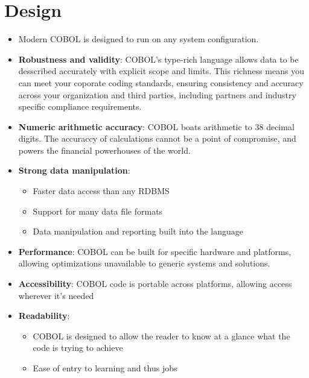 \documentclass[12pt]{article}
\begin{document}
\section{Design}

\begin{itemize}

    \item Modern COBOL is designed to run on any system configuration.
    \item \textbf{Robustness and validity}: COBOL's type-rich language allows data to be desscribed accurately with explicit scope and limits. This richness means you can meet your coporate coding standards, ensuring consistency and accuracy across your organization and third parties, including partners and industry specific compliance requirements.
    \item \textbf{Numeric arithmetic accuracy}: COBOL boats arithmetic to 38 decimal digits. The accuraccy of calculations cannot be a point of compromise, and powers the financial powerhouses of the world.
    \item \textbf{Strong data manipulation}:
    \begin{itemize}
        \item Faster data access than any RDBMS
        \item Support for many data file formats
        \item Data manipulation and reporting built into the language
    \end{itemize}
    \item \textbf{Performance}: COBOL can be built for specific hardware and platforms, allowing optimizations unavailable to generic systems and solutions.
    \item \textbf{Accessibility}: COBOL code is portable across platforms, allowing access wherever it's needed
    \item \textbf{Readability}:
    \begin{itemize}
        \item COBOL is designed to allow the reader to know at a glance what the code is trying to achieve
        \item Ease of entry to learning and thus jobs
    \end{itemize}

\end{itemize}
\end{document}
